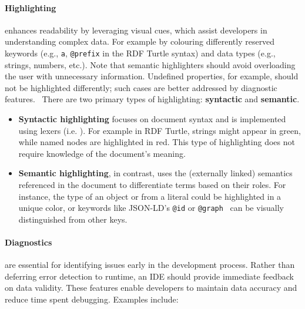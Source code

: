 \paragraph*{Highlighting} enhances readability by leveraging visual cues, which assist developers in understanding complex data.
For example by colouring differently reserved keywords (e.g., \texttt{a}, \texttt{@prefix} in the RDF Turtle syntax) and data types (e.g., strings, numbers, etc.).  
Note that semantic highlighters should avoid overloading the user with unnecessary information. 
Undefined properties, for example, should not be highlighted differently; such cases are better addressed by diagnostic features.~
There are two primary types of highlighting: \textbf{syntactic} and \textbf{semantic}.

\begin{itemize}
    \item \textbf{Syntactic highlighting} focuses on document syntax and is implemented using lexers (i.e. ). For example in RDF Turtle, strings might appear in green, while named nodes are highlighted in red. This type of highlighting does not require knowledge of the document's meaning.~
    \item \textbf{Semantic highlighting}, in contrast, uses the (externally linked) semantics referenced in the document to differentiate terms based on their roles. For instance, the type of an object or from a literal could be highlighted in a unique color, or keywords like JSON-LD's \texttt{@id} or \texttt{@graph}~ can be visually distinguished from other keys.~
\end{itemize}


\paragraph*{Diagnostics} are essential for identifying issues early in the development process. 
Rather than deferring error detection to runtime, an IDE should provide immediate feedback on data validity.
These features enable developers to maintain data accuracy and reduce time spent debugging. Examples include:

